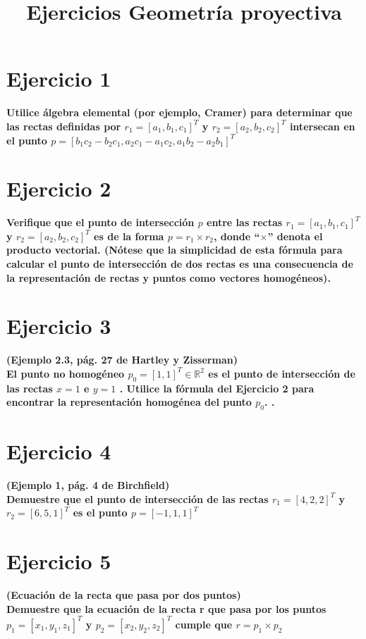 \documentclass[12pt]{article}
\title{%
Ejercicios Geometría proyectiva
}
\date{}
\begin{document}
\maketitle


\section{Ejercicio 1}
\textbf{
Utilice álgebra elemental (por ejemplo, Cramer) para determinar
que las rectas definidas por $r_{1}=[a_{1}, b_{1}, c_{1}]^{T}$ y $r_{2}=[a_{2},b_{2},c_{2}]^{T}$ intersecan en el punto $p=[b_{1}c_{2}-b_{2}c_{1}, a_{2}c_{1}-a_{1}c_{2}, a_{1}b_{2}-a_{2}b_{1}]^{T}$
}
\\

\section{Ejercicio 2}
\textbf{
Verifique que el punto de intersección $p$ entre las rectas $r_{1}= [a_{1}, b_{1}, c_{1}]^{T}$ y $r_{2}=[a_{2},b_{2},c_{2}]^{T}$ es de la forma $p=r_{1} \times r_{2}$, donde
“$\times$” denota el producto vectorial. (Nótese que la simplicidad de esta fórmula para calcular el punto de intersección de dos rectas es una consecuencia de la representación de rectas y puntos como vectores homogéneos).
}

\section{Ejercicio 3}
\textbf{
(Ejemplo 2.3, pág. 27 de Hartley y Zisserman)\\
El punto no homogéneo $p_{0}=[1, 1]^{T} \in \mathbb{R}^{2}$ es el punto de intersección de las
rectas $x=1$ e $y=1$ . Utilice la fórmula del Ejercicio 2 para encontrar la representación homogénea del punto $p_{0}$. .
}

\section{Ejercicio 4}
\textbf{
(Ejemplo 1, pág. 4 de Birchfield)\\
Demuestre que el punto de intersección de las rectas $r_{1}=[4, 2, 2]^{T}$ y $r_{2}=[6, 5, 1]^{T}$ es el punto $p=[-1, 1, 1]^{T}$
}

\section{Ejercicio 5}
\textbf{(Ecuación de la recta que pasa por dos puntos)\\
Demuestre que la ecuación de la recta r que pasa por los puntos $p_{1}=[x_{1}, y_{1}, z_{1}]^{T}$ y $p_{2}=[x_{2}, y_{2}, z_{2}]^{T}$ cumple que $r=p_{1} \times p_{2}$
}
\\
\end{document}

